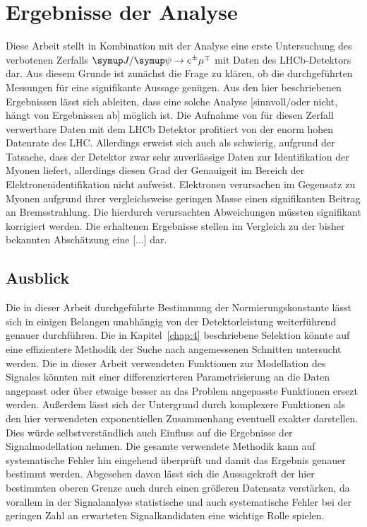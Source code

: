 \chapter{Ergebnisse der Analyse}
\label{chap:5}
%
Diese Arbeit stellt in Kombination mit der Analyse \cite{ba-maik} eine erste Untersuchung des verbotenen Zerfalls $\signal$ mit
Daten des LHCb-Detektors dar. Aus diesem Grunde ist zunächst die Frage zu klären, ob die durchgeführten Messungen für eine signifikante
Aussage genügen. Aus den hier beschriebenen Ergebnissen lässt sich ableiten, dass eine solche Analyse [sinnvoll/oder nicht, hängt von Ergebnissen ab] möglich ist.
Die Aufnahme von für diesen Zerfall verwertbare Daten mit dem LHCb Detektor profitiert von der enorm hohen Datenrate des LHC. Allerdings
erweist sich auch als schwierig, aufgrund der Tatsache, dass der Detektor zwar sehr zuverlässige Daten zur Identifikation der Myonen liefert,
allerdings diesen Grad der Genauigeit im Bereich der Elektronenidentifikation nicht aufweist. Elektronen verursachen im Gegensatz zu Myonen aufgrund ihrer vergleichsweise
geringen Masse einen signifikanten Beitrag an Bremsstrahlung. Die hierdurch verursachten Abweichungen müssten signifikant korrigiert werden.
Die erhaltenen Ergebnisse stellen im Vergleich zu der bisher bekannten Abschätzung eine [...] dar.

\section{Ausblick}
%
Die in dieser Arbeit durchgeführte Bestimmung der Normierungskonstante lässt sich in einigen Belangen unabhängig von der Detektorleistung
weiterführend genauer durchführen. Die in Kapitel~\ref{chap:4} beschriebene Selektion könnte auf eine effizientere Methodik der Suche nach angemessenen
Schnitten untersucht werden. Die in dieser Arbeit verwendeten Funktionen zur Modellation des Signales könnten mit einer differenzierteren
Parametrisierung an die Daten angepasst oder über etwaige besser an das Problem angepasste Funktionen ersezt werden. Außerdem lässt sich der Untergrund
durch komplexere Funktionen als den hier verwendeten exponentiellen Zusammenhang eventuell exakter darstellen. Dies würde selbstverständlich auch
Einfluss auf die Ergebnisse der Signalmodellation nehmen. Die gesamte verwendete Methodik kann auf systematische Fehler hin eingehend überprüft und
damit das Ergebnis genauer bestimmt werden. Abgesehen davon lässt sich die Aussagekraft der hier bestimmten oberen Grenze auch durch einen größeren
Datensatz verstärken, da vorallem in der Signalanalyse statistische und auch systematische Fehler bei der geringen Zahl an erwarteten Signalkandidaten
eine wichtige Rolle spielen.
